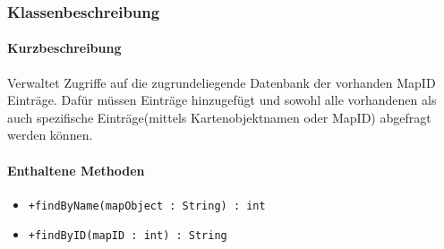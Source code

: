 \subsubsection*{Klassenbeschreibung}%
\paragraph*{Kurzbeschreibung}
Verwaltet Zugriffe auf die zugrundeliegende Datenbank der vorhanden MapID Einträge.
Dafür müssen Einträge hinzugefügt und sowohl alle vorhandenen als auch spezifische Einträge(mittels Kartenobjektnamen oder MapID) 
abgefragt werden können.
\paragraph*{Enthaltene Methoden}
\begin{itemize}
    \item \texttt{+findByName(mapObject : String) : int}
    \item \texttt{+findByID(mapID : int) : String}
\end{itemize}
